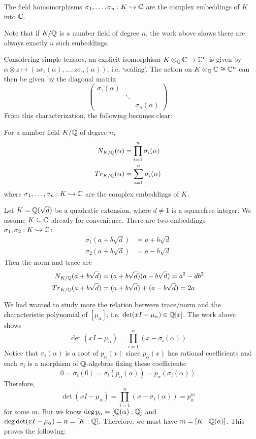 \begin{dfn}
The field homomorphisms $\sigma_1,\ldots,\sigma_n: K \hookrightarrow \mathbb{C}$ are the complex embeddings of $K$ into $\mathbb{C}$.
\end{dfn}

\begin{rem}
Note that if $K/\mathbb{Q}$ is a number field of degree $n$, the work above shows there are always exactly $n$ such embeddings. 
\end{rem}

Considering simple tensors, an explicit isomorphism $K \otimes_{\mathbb{Q}} \mathbb{C} \to \mathbb{C}^n$ is given by $\alpha \otimes z \mapsto (z\sigma_1(\alpha),\ldots,z\sigma_n(\alpha))$, i.e. `scaling'. The action on $K \otimes_{\mathbb{Q}} \mathbb{C} \cong \mathbb{C}^n$ can then be given by the diagonal matrix
	\[
	\begin{pmatrix}
	\sigma_1(\alpha) & & \\
	& \ddots & \\
	& & \sigma_n(\alpha)
	\end{pmatrix}
	\]
From this characterization, the following becomes clear:

\begin{prop}
For a number field $K/\mathbb{Q}$ of degree $n$,
	\[
	\begin{split}
	N_{K/\mathbb{Q}}(\alpha)&= \prod_{i=1}^n \sigma_i(\alpha) \\
	Tr_{K/\mathbb{Q}}(\alpha)&= \sum_{i=1}^n \sigma_i(\alpha)
	\end{split}
	\]
where $\sigma_1,\ldots,\sigma_n: K \hookrightarrow \mathbb{C}$ are the complex embeddings of $K$.
\end{prop}

\begin{ex}
Let $K=\mathbb{Q}(\sqrt{d})$ be a quadratic extension, where $d \neq 1$ is a squarefree integer. We assume $K \subseteq \mathbb{C}$ already for convenience. There are two embeddings $\sigma_1,\sigma_2: K \hookrightarrow \mathbb{C}$:
	\[
	\begin{split}
	\sigma_1(a+b\sqrt{d})&= a+b\sqrt{d} \\
	\sigma_2(a+b\sqrt{d})&= a-b\sqrt{d}
	\end{split}
	\]
Then the norm and trace are
	\[
	\begin{split}
	N_{K/\mathbb{Q}}(a+b\sqrt{d})&= (a+b\sqrt{d})(a-b\sqrt{d})= a^2-db^2 \\
	Tr_{K/\mathbb{Q}}(a+b\sqrt{d})&= (a+b\sqrt{d}) + (a-b\sqrt{d})= 2a
	\end{split}
	\] \xqed
\end{ex}


We had wanted to study more the relation between trace/norm and the characteristic polynomial of $[\mu_\alpha]$, i.e. $\det(xI-\mu_\alpha) \in \mathbb{Q}[x]$. The work above shows
	\[
	\det(xI - \mu_\alpha)= \prod_{i=1}^n (x - \sigma_i(\alpha))
	\]
Notice that $\sigma_i(\alpha)$ is a root of $p_\alpha(x)$ since $p_\alpha(x)$ has rational coefficients and each $\sigma_i$ is a morphism of $\mathbb{Q}$-algebras fixing these coefficients:
	\[
	0=\sigma_i(0)=\sigma_i(p_\alpha(\alpha))=p_\alpha(\sigma_i(\alpha))
	\]
Therefore,
	\[
	\det(xI - \mu_\alpha)= \prod_{i=1}^n (x - \sigma_i(\alpha))= p_\alpha^m
	\]
for some $m$. But we know $\deg p_\alpha=[\mathbb{Q}(\alpha):\mathbb{Q}]$ and $\deg \det(xI - \mu_\alpha)=n=[K:\mathbb{Q}]$. Therefore, we must have $m=[K:\mathbb{Q}(\alpha)]$. This proves the following:

